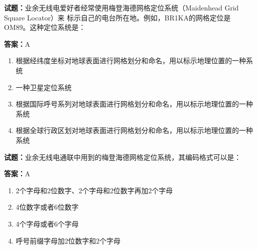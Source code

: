 \documentclass{ctexbook}
\begin{document}




\vspace{1em}

\textbf{试题：}业余无线电爱好者经常使用梅登海德网格定位系统（Maidenhead Grid Square Locator）来
标示自己的电台所在地。例如，BR1KA的网格定位是OM89。这种定位系统是： 

\textbf{答案：}A 

\begin{enumerate}[leftmargin=3em]
  \item 根据经纬度坐标对地球表面进行网格划分和命名，用以标示地理位置的一种系统 

  \item 一种卫星定位系统 

  \item 根据国际呼号系列对地球表面进行网格划分和命名，用以标示地理位置的一种系统 

  \item 根据全球行政区划对地球表面进行网格划分和命名，用以标示地理位置的一种系统 

\end{enumerate}





\vspace{1em}

\textbf{试题：}业余无线电通联中用到的梅登海德网格定位系统，其编码格式可以是： 

\textbf{答案：}A 

\begin{enumerate}[leftmargin=3em]
  \item 2个字母和2位数字、2个字母和2位数字再加2个字母 

  \item 4位数字或者6位数字 

  \item 4个字母或者6个字母 

  \item 呼号前缀字母加2位数字和2个字母 

\end{enumerate}





\vspace{1em}
\end{document}
